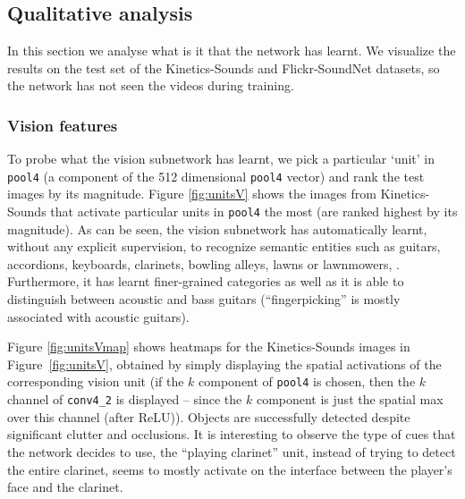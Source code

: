 \documentclass[10pt,twocolumn,letterpaper]{article}
\begin{document}
\subsection{Qualitative analysis}
\label{sec:resqual}

In this section we analyse what is it that the network has learnt.
We visualize the results on the test set of the Kinetics-Sounds and Flickr-SoundNet datasets,
so the network has not seen the videos during training.

\subsubsection{Vision features}
To probe what the vision subnetwork has learnt, we pick a particular `unit'
in \texttt{pool4} (\ie a component of the 512 dimensional \texttt{pool4} vector) and rank the test images by its magnitude.
Figure \ref{fig:unitsV} shows the images from Kinetics-Sounds that activate particular
units in \texttt{pool4} the most (\ie are ranked highest by its magnitude). As can be
seen, the vision subnetwork has automatically learnt, without any
explicit supervision, to recognize semantic entities such as guitars,
accordions, keyboards, clarinets, bowling alleys, lawns or lawnmowers,
\etc.  Furthermore, it has learnt finer-grained categories as well as
it is able to distinguish between acoustic and bass guitars
(``fingerpicking'' is mostly associated with acoustic guitars).

Figure \ref{fig:unitsVmap} shows heatmaps for the Kinetics-Sounds images in 
Figure~\ref{fig:unitsV}, obtained by simply displaying the spatial
activations of the corresponding vision unit (\ie if the $k$ component of
\texttt{pool4} is chosen, then the $k$ channel of \texttt{conv4\_2} is displayed -- since the $k$ component is just the spatial max over this channel 
(after ReLU)).
 Objects are successfully
detected despite significant clutter and occlusions.  It is
interesting to observe the type of cues that the network decides to
use, \eg the ``playing clarinet'' unit, instead of trying to detect
the entire clarinet, seems to mostly activate on the interface between
the player's face and the clarinet.
\end{document}

